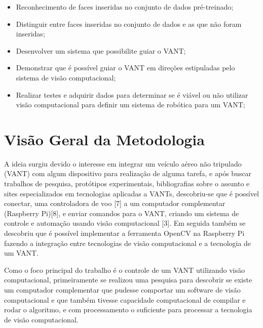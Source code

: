 \begin{itemize}
    \item Reconhecimento de faces inseridas no conjunto de dados pré-treinado;
	\item Distinguir entre faces inseridas no conjunto de dados e as que não foram inseridas;
	\item Desenvolver um sistema que possibilite guiar o VANT;
	\item Demonstrar que é possível guiar o VANT em direções estipuladas pelo sistema de visão computacional;
	\item Realizar testes e adquirir dados para determinar se é viável ou não utilizar visão computacional para definir um sistema de robótica para um VANT;
\end{itemize}



\section{Visão Geral da Metodologia}

A ideia surgiu devido o interesse em integrar um veículo aéreo não tripulado (VANT) com algum dispositivo para realização de alguma tarefa, e após buscar trabalhos de pesquisa, protótipos experimentais, bibliografias sobre o assunto e sites especializados em tecnologias aplicadas a VANTs, descobriu-se que é possível conectar, uma controladora de voo \cite{sete} [7] a um computador complementar (Raspberry Pi)\cite{oito}[8], e enviar comandos para o VANT, criando um sistema de controle e automação usando visão computacional \cite{tres}[3]. Em seguida também se descobriu que é possível implementar a ferramenta OpenCV na Raspberry Pi fazendo a integração entre tecnologias de visão computacional e a tecnologia de um VANT.

Como o foco principal do trabalho é o controle de um VANT utilizando visão computacional, primeiramente se realizou uma pesquisa para descobrir se existe um computador complementar que pudesse comportar um software de visão computacional e que também tivesse capacidade computacional de compilar e rodar o algoritmo, e com processamento o suficiente para processar a tecnologia de visão computacional.

